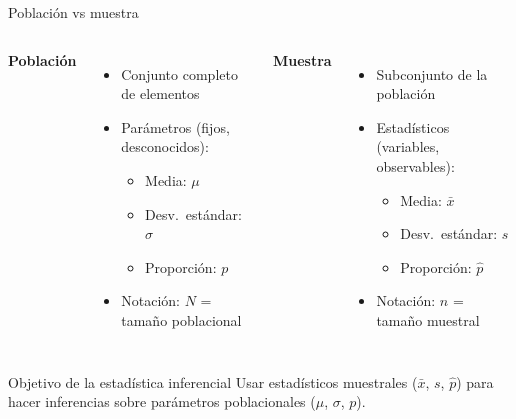 \documentclass[aspectratio=169, 11pt]{beamer}
\begin{document}
\begin{frame}{Población vs muestra}
\begin{columns}[T]
\textbf{Población}
\begin{itemize}
\item Conjunto completo de elementos
\item Parámetros (fijos, desconocidos):
  \begin{itemize}
  \item Media: $\mu$
  \item Desv.\ estándar: $\sigma$
  \item Proporción: $p$
  \end{itemize}
\item Notación: $N$ = tamaño poblacional
\end{itemize}

\textbf{Muestra}
\begin{itemize}
\item Subconjunto de la población
\item Estadísticos (variables, observables):
  \begin{itemize}
  \item Media: $\bar{x}$
  \item Desv.\ estándar: $s$
  \item Proporción: $\hat{p}$
  \end{itemize}
\item Notación: $n$ = tamaño muestral
\end{itemize}
\end{columns}

\vspace{0.5em}
\begin{block}{Objetivo de la estadística inferencial}
Usar estadísticos muestrales ($\bar{x}$, $s$, $\hat{p}$) para hacer inferencias sobre parámetros poblacionales ($\mu$, $\sigma$, $p$).
\end{block}
\end{frame}
\end{document}
